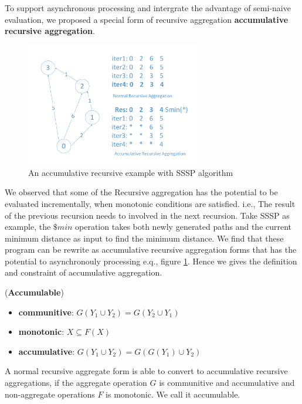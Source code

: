 {To support asynchronous processing and intergrate the advantage of semi-naive evaluation, we proposed a special form of recursive aggregation  \textbf{accumulative recursive aggregation}.
	\begin{figure}[t]
		\vspace{-0.1in}
		\centerline{\includegraphics[width=3in]{fig/sssp-example.pdf}}
		\caption{An accumulative recursive example with SSSP algorithm}
		\vspace{-0.1in}
		\label{fig:arasssp}
	\end{figure}
	
	
We observed that some of the Recursive aggregation has the potential to be evaluated incrementally, when monotonic conditions are satisfied. i.e., The result of the previous recursion needs to involved in the next recursion. Take SSSP as example, the $\$min$ operation takes both newly generated paths and the current minimum distance as input to find the minimum distance. We find that these program can be rewrite as accumulative recursive aggregation forms that has the potential to asynchronouly processing e.q., figure \ref{fig:arasssp}. Hence we gives the definition and constraint of accumulative aggregation.


\begin{definition}
	\label{th:monotone}
	(\textbf{Accumulable}) 
	\begin{itemize}
		\item \textbf{communitive}: $G(Y_1\cup Y_2)=G(Y_2\cup Y_1)$
		\item \textbf{monotonic}: $X\subseteq F(X)$
		\item \textbf{accumulative}: $G(Y_1\cup Y_2)=G(G(Y_1)\cup Y_2)$
	\end{itemize}
	A normal recursive aggregate form is able to convert to accumulative recursive aggregations, if the aggregate operation $G$ is communitive and accumulative and non-aggregate operations $F$ is monotonic. We call it accumulable.
\end{definition}
	
}
